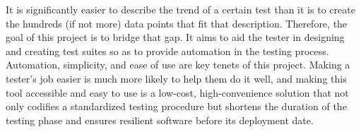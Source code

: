 It is significantly easier to describe the trend of a certain test than it is to create the hundreds (if not more) data points that fit that description. Therefore, the goal of this project is to bridge that gap. It aims to aid the tester in designing and creating test suites so as to provide automation in the testing process. Automation, simplicity, and ease of use are key tenets of this project. Making a tester's job easier is much more likely to help them do it well, and making this tool accessible and easy to use is a low-cost, high-convenience solution that not only codifies a standardized testing procedure but shortens the duration of the testing phase and ensures resilient software before its deployment date. 